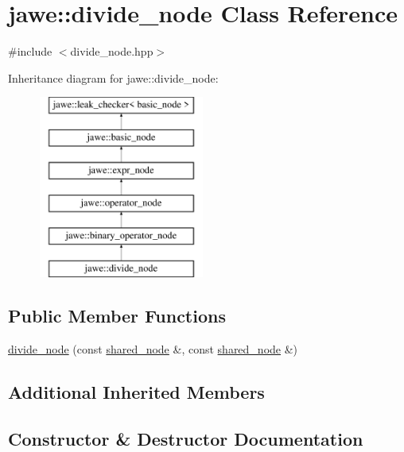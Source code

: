 \hypertarget{classjawe_1_1divide__node}{}\section{jawe\+:\+:divide\+\_\+node Class Reference}
\label{classjawe_1_1divide__node}


{\ttfamily \#include $<$divide\+\_\+node.\+hpp$>$}

Inheritance diagram for jawe\+:\+:divide\+\_\+node\+:\begin{figure}[H]
\begin{center}
\leavevmode
\includegraphics[height=6.000000cm]{classjawe_1_1divide__node}
\end{center}
\end{figure}
\subsection*{Public Member Functions}
\begin{DoxyCompactItemize}
\item 
\hyperlink{classjawe_1_1divide__node_a91819747503211c892a0055a5284e241}{divide\+\_\+node} (const \hyperlink{namespacejawe_a3f307481d921b6cbb50cc8511fc2b544}{shared\+\_\+node} \&, const \hyperlink{namespacejawe_a3f307481d921b6cbb50cc8511fc2b544}{shared\+\_\+node} \&)
\end{DoxyCompactItemize}
\subsection*{Additional Inherited Members}


\subsection{Constructor \& Destructor Documentation}
\mbox{\label{classjawe_1_1divide__node_a91819747503211c892a0055a5284e241}} 
